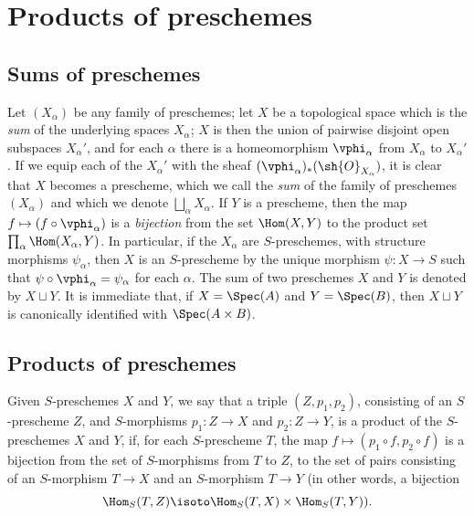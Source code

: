 \section{Products of preschemes}
\label{section:I.3}

\subsection{Sums of preschemes}
\label{subsection:I.3.1}
\label{I.3.1}

\label{I.3.1.1}
Let $(X_\alpha)$ be any family of preschemes; let $X$ be a topological space which is the
\emph{sum} of the underlying spaces $X_\alpha$; $X$ is then the union of pairwise
disjoint open subspaces $X_\alpha'$, and for each $\alpha$ there is a homeomorphism
$\vphi_\alpha$ from $X_\alpha$ to $X_\alpha'$. If we equip each of the $X_\alpha'$ with the
sheaf $(\vphi_\alpha)_*(\sh{O}_{X_\alpha})$, it is clear that $X$ becomes a prescheme, which
we call the \emph{sum} of the family of preschemes $(X_\alpha)$ and which we denote
$\bigsqcup_\alpha X_\alpha$. If $Y$ is a prescheme, then the map $f\mapsto(f\circ\vphi_\alpha)$ is a
\emph{bijection} from the set $\Hom(X,Y)$ to the product set $\prod_\alpha\Hom(X_\alpha,Y)$.
In particular, if the $X_\alpha$ are $S$-preschemes, with structure morphisms $\psi_\alpha$, then $X$ is an $S$-prescheme by the unique morphism $\psi:X\to S$ such that
$\psi\circ\vphi_\alpha=\psi_\alpha$ for each $\alpha$. The sum of two preschemes $X$ and $Y$ is denoted by $X\sqcup Y$.
It is immediate that, if $X=\Spec(A)$ and $Y=\Spec(B)$, then $X\sqcup Y$ is canonically identified with $\Spec(A\times B)$.

\subsection{Products of preschemes}
\label{subsection:I.3.2}

\begin{definition}[3.2.1]
\label{I.3.2.1}
Given $S$-preschemes $X$ and $Y$, we say that a triple $(Z,p_1,p_2)$, consisting of an
$S$-prescheme $Z$, and $S$-morphisms $p_1:Z\to X$ and $p_2:Z\to Y$, is a product of the
$S$-preschemes $X$ and $Y$, if, for each $S$-prescheme $T$, the map
$f\mapsto(p_1\circ f,p_2\circ f)$ is a bijection from the set of $S$-morphisms from $T$ to
$Z$, to the set of pairs consisting of an $S$-morphism $T\to X$ and an $S$-morphism $T\to Y$
(in other words, a bijection
\[
  \Hom_S(T,Z)\isoto\Hom_S(T,X)\times\Hom_S(T,Y)).
\]
\end{definition}


